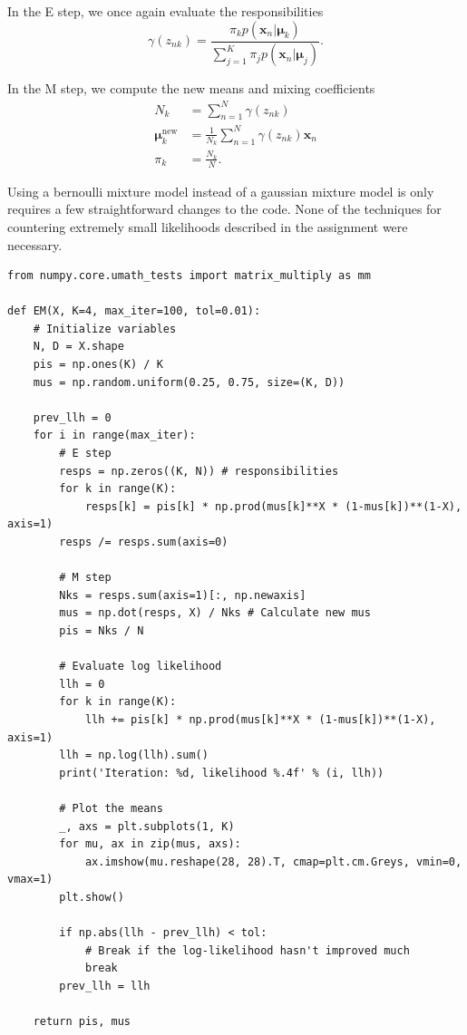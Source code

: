 \documentclass[a4paper]{article}
\begin{document}
\begin{enumerate}
In the E step, we once again evaluate the responsibilities
\begin{equation}
\gamma(z_{nk}) = \frac{\pi_kp(\bm{x}_n|\bm{\mu}_k)}{\sum_{j=1}^K\pi_jp(\bm{x}_n|\bm{\mu}_j)}.
\end{equation}

In the M step, we compute the new means and mixing coefficients
\begin{align}
N_k &= \sum_{n=1}^N\gamma(z_{nk}) \\
\bm{\mu}_k^{\text{new}} &=\frac{1}{N_k}\sum_{n=1}^N\gamma(z_{nk})\bm{x}_n \\
\pi_k &= \frac{N_k}{N}.
\end{align}

Using a bernoulli mixture model instead of a gaussian mixture model is only requires a few straightforward changes to the code. None of the techniques for countering extremely small likelihoods described in the assignment were necessary.

\begin{lstlisting}
from numpy.core.umath_tests import matrix_multiply as mm

def EM(X, K=4, max_iter=100, tol=0.01):
    # Initialize variables
    N, D = X.shape
    pis = np.ones(K) / K
    mus = np.random.uniform(0.25, 0.75, size=(K, D))
    
    prev_llh = 0
    for i in range(max_iter):
        # E step
        resps = np.zeros((K, N)) # responsibilities
        for k in range(K):
            resps[k] = pis[k] * np.prod(mus[k]**X * (1-mus[k])**(1-X), axis=1)
        resps /= resps.sum(axis=0)
        
        # M step
        Nks = resps.sum(axis=1)[:, np.newaxis]
        mus = np.dot(resps, X) / Nks # Calculate new mus
        pis = Nks / N
        
        # Evaluate log likelihood
        llh = 0
        for k in range(K):
            llh += pis[k] * np.prod(mus[k]**X * (1-mus[k])**(1-X), axis=1)
        llh = np.log(llh).sum()
        print('Iteration: %d, likelihood %.4f' % (i, llh))
        
        # Plot the means
        _, axs = plt.subplots(1, K)
        for mu, ax in zip(mus, axs):
            ax.imshow(mu.reshape(28, 28).T, cmap=plt.cm.Greys, vmin=0, vmax=1)
        plt.show()

        if np.abs(llh - prev_llh) < tol:
            # Break if the log-likelihood hasn't improved much
            break
        prev_llh = llh
    
    return pis, mus
\end{lstlisting}


\end{enumerate}
\end{document}
